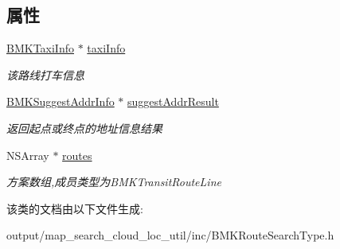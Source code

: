 \subsection*{属性}
\begin{DoxyCompactItemize}
\item 
\hypertarget{interface_b_m_k_transit_route_result_ae880202db7750ff403011f52fc3b87b7}{\hyperlink{interface_b_m_k_taxi_info}{B\+M\+K\+Taxi\+Info} $\ast$ \hyperlink{interface_b_m_k_transit_route_result_ae880202db7750ff403011f52fc3b87b7}{taxi\+Info}}\label{interface_b_m_k_transit_route_result_ae880202db7750ff403011f52fc3b87b7}

\begin{DoxyCompactList}\small\item\em 该路线打车信息 \end{DoxyCompactList}\item 
\hypertarget{interface_b_m_k_transit_route_result_ab5908f0b5471308dbd0ea14618c1b1d6}{\hyperlink{interface_b_m_k_suggest_addr_info}{B\+M\+K\+Suggest\+Addr\+Info} $\ast$ \hyperlink{interface_b_m_k_transit_route_result_ab5908f0b5471308dbd0ea14618c1b1d6}{suggest\+Addr\+Result}}\label{interface_b_m_k_transit_route_result_ab5908f0b5471308dbd0ea14618c1b1d6}

\begin{DoxyCompactList}\small\item\em 返回起点或终点的地址信息结果 \end{DoxyCompactList}\item 
\hypertarget{interface_b_m_k_transit_route_result_ad23c905161697d0549715622abd4b400}{N\+S\+Array $\ast$ \hyperlink{interface_b_m_k_transit_route_result_ad23c905161697d0549715622abd4b400}{routes}}\label{interface_b_m_k_transit_route_result_ad23c905161697d0549715622abd4b400}

\begin{DoxyCompactList}\small\item\em 方案数组,成员类型为\+B\+M\+K\+Transit\+Route\+Line \end{DoxyCompactList}\end{DoxyCompactItemize}


该类的文档由以下文件生成\+:\begin{DoxyCompactItemize}
\item 
output/map\+\_\+search\+\_\+cloud\+\_\+loc\+\_\+util/inc/B\+M\+K\+Route\+Search\+Type.\+h\end{DoxyCompactItemize}
